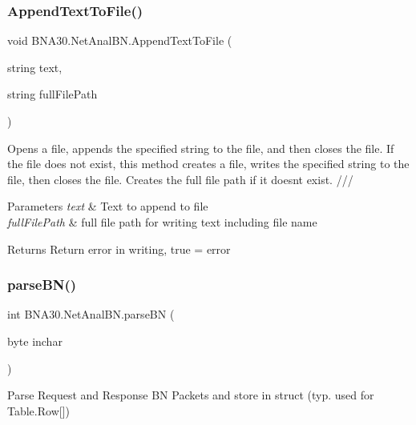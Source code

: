 \subsubsection{\texorpdfstring{AppendTextToFile()}{AppendTextToFile()}}
{\footnotesize\ttfamily void B\+N\+A30.\+Net\+Anal\+B\+N.\+Append\+Text\+To\+File (\begin{DoxyParamCaption}\item[{string}]{text,  }\item[{string}]{full\+File\+Path }\end{DoxyParamCaption})\hspace{0.3cm}{\ttfamily [inline]}}



Opens a file, appends the specified string to the file, and then closes the file. If the file does not exist, this method creates a file, writes the specified string to the file, then closes the file. Creates the full file path if it doesn\textquotesingle{}t exist. /// 


\begin{DoxyParams}{Parameters}
{\em text} & Text to append to file\\
\hline
{\em full\+File\+Path} & full file path for writing text including file name\\
\hline
\end{DoxyParams}
\begin{DoxyReturn}{Returns}
Return error in writing, true = error 
\end{DoxyReturn}
\mbox{\label{class_b_n_a30_1_1_net_anal_b_n_a6e3432d24c574a4b35714894e5600896}} 
\subsubsection{\texorpdfstring{parseBN()}{parseBN()}}
{\footnotesize\ttfamily int B\+N\+A30.\+Net\+Anal\+B\+N.\+parse\+BN (\begin{DoxyParamCaption}\item[{byte}]{inchar }\end{DoxyParamCaption})\hspace{0.3cm}{\ttfamily [inline]}}



Parse Request and Response BN Packets and store in struct (typ. used for Table.\+Row\mbox{[}\mbox{]}) 


